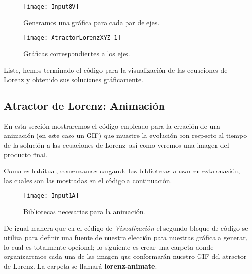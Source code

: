 \begin{figure}[h!]
	\begin{center}
		\texttt{[image: Input8V]}
        \caption{Generamos una gráfica para cada par de ejes.}
        \label{fig8:AtractorEjes}
	\end{center}
\end{figure}

\begin{figure}[h!]
	\begin{center}
		\texttt{[image: AtractorLorenzXYZ-1]}
        \caption{Gráficas correspondientes a los ejes.}
        \label{fig9:GrafAtractorEjes}
	\end{center}
\end{figure}

Listo, hemos terminado el código para la visualización de las ecuaciones de Lorenz y obtenido sus soluciones gráficamente.

\vfill
\vline
\space
\par \vspace{2cm}

\subsection{Atractor de Lorenz: Animación}
En esta sección mostraremos el código empleado para la creación de una animación (en este caso un GIF) que muestre la evolución con respecto al tiempo de la solución a las ecuaciones de Lorenz, así como veremos una imagen del producto final.

Como es habitual, comenzamos cargando las bibliotecas a usar en esta ocasión, las cuales son las mostradas en el código a continuación.

\begin{figure}[h!]
	\begin{center}
		\texttt{[image: Input1A]}
        \caption{Bibliotecas necesarias para la animación.}
        \label{fig10:BibliotecasA}
	\end{center}
\end{figure}

De igual manera que en el código de \textsl{Visualización} el segundo bloque de código se utiliza para definir una fuente de nuestra elección para nuestras gráfica a generar, lo cual es totalmente opcional; lo siguiente es crear una carpeta donde organizaremos cada una de las imagen que conformarán nuestro GIF del atractor de Lorenz. La carpeta se llamará \textbf{lorenz-animate}.

